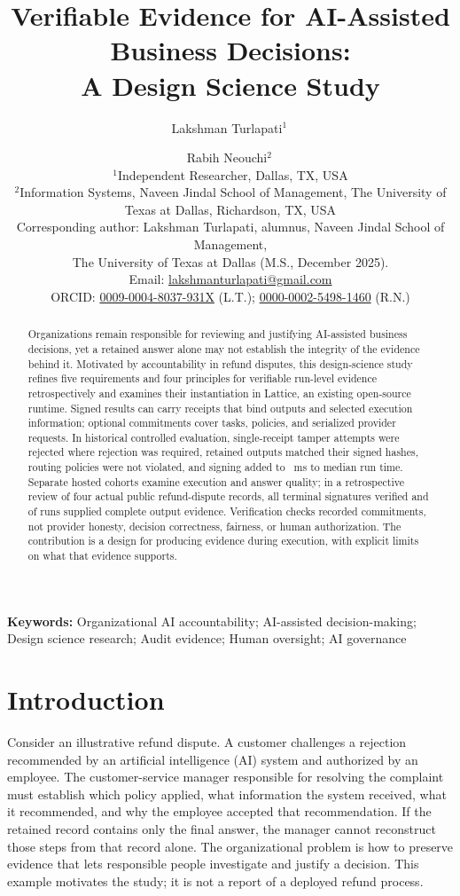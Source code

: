 \documentclass[11pt]{article}
\title{Verifiable Evidence for AI-Assisted Business Decisions:\\A Design Science Study}
\author{Lakshman Turlapati$^{1}$\,\orcidlink{0009-0004-8037-931X} \and Rabih Neouchi$^{2}$\,\orcidlink{0000-0002-5498-1460}\\[4pt]
\small $^{1}$Independent Researcher, Dallas, TX, USA\\
\small $^{2}$Information Systems, Naveen Jindal School of Management, The University of Texas at Dallas, Richardson, TX, USA\\
\small Corresponding author: Lakshman Turlapati, alumnus, Naveen Jindal School of Management,\\
\small The University of Texas at Dallas (M.S., December 2025).\\
\small Email: \href{mailto:lakshmanturlapati@gmail.com}{lakshmanturlapati@gmail.com}\\
\small ORCID: \href{https://orcid.org/0009-0004-8037-931X}{0009-0004-8037-931X} (L.T.);
\href{https://orcid.org/0000-0002-5498-1460}{0000-0002-5498-1460} (R.N.)
}
\date{}
\begin{document}
\maketitle

\begin{abstract}
\noindent Organizations remain responsible for reviewing and justifying AI-assisted business decisions, yet a retained answer alone may not establish the integrity of the evidence behind it. Motivated by accountability in refund disputes, this design-science study refines five requirements and four principles for verifiable run-level evidence retrospectively and examines their instantiation in Lattice, an existing open-source runtime. Signed results can carry receipts that bind outputs and selected execution information; optional commitments cover tasks, policies, and serialized provider requests. In historical controlled evaluation, single-receipt tamper attempts were rejected where rejection was required, retained outputs matched their signed hashes, routing policies were not violated, and signing added \CfourSignDeltaMinMs{} to \CfourSignDeltaMaxMs{}~ms to median run time. Separate hosted cohorts examine execution and answer quality; in a retrospective review of four actual public refund-dispute records, all \CfourPublicSignatures{} terminal signatures verified and \CfourPublicPackages{} of \CfourPublicPlanned{} runs supplied complete output evidence. Verification checks recorded commitments, not provider honesty, decision correctness, fairness, or human authorization. The contribution is a design for producing evidence during execution, with explicit limits on what that evidence supports.
\end{abstract}

\noindent\textbf{Keywords:} Organizational AI accountability; AI-assisted decision-making; Design science research; Audit evidence; Human oversight; AI governance

\section{Introduction}\label{sec:intro}

Consider an illustrative refund dispute. A customer challenges a rejection recommended by an artificial intelligence (AI) system and authorized by an employee. The customer-service manager responsible for resolving the complaint must establish which policy applied, what information the system received, what it recommended, and why the employee accepted that recommendation. If the retained record contains only the final answer, the manager cannot reconstruct those steps from that record alone. The organizational problem is how to preserve evidence that lets responsible people investigate and justify a decision. This example motivates the study; it is not a report of a deployed refund process.
\end{document}
